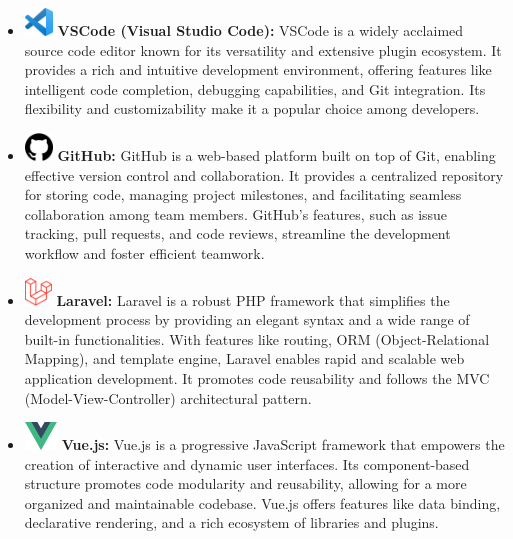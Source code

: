 \begin{itemize}
  \item  \includegraphics[height=2em]{Visual_Studio_Code_1.35_icon.svg.png} \textbf{VSCode (Visual Studio Code):} VSCode is a widely acclaimed source code editor known for its versatility and extensive plugin ecosystem. It provides a rich and intuitive development environment, offering features like intelligent code completion, debugging capabilities, and Git integration. Its flexibility and customizability make it a popular choice among developers.
  
  \item \includegraphics[height=2em]{github-logo.png} \textbf{GitHub:} GitHub is a web-based platform built on top of Git, enabling effective version control and collaboration. It provides a centralized repository for storing code, managing project milestones, and facilitating seamless collaboration among team members. GitHub's features, such as issue tracking, pull requests, and code reviews, streamline the development workflow and foster efficient teamwork.
  
  \item \includegraphics[height=2em]{1200px-Laravel.svg.png} \textbf{Laravel:} Laravel is a robust PHP framework that simplifies the development process by providing an elegant syntax and a wide range of built-in functionalities. With features like routing, ORM (Object-Relational Mapping), and template engine, Laravel enables rapid and scalable web application development. It promotes code reusability and follows the MVC (Model-View-Controller) architectural pattern.
  
  \item \includegraphics[height=2em]{Vue.js_Logo_2.svg.png} \textbf{Vue.js:} Vue.js is a progressive JavaScript framework that empowers the creation of interactive and dynamic user interfaces. Its component-based structure promotes code modularity and reusability, allowing for a more organized and maintainable codebase. Vue.js offers features like data binding, declarative rendering, and a rich ecosystem of libraries and plugins.
  

\end{itemize}
